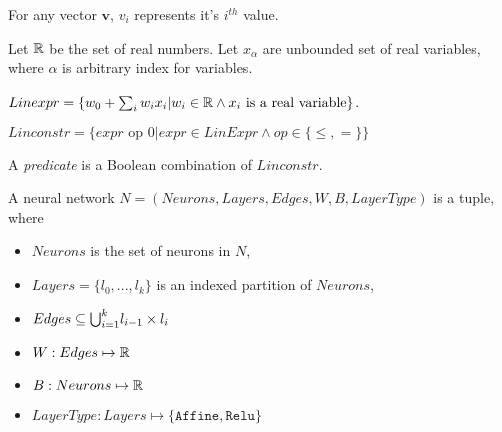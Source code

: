 For any vector $\boldsymbol{v}$, $v_i$ represents it's $i^{th}$ value.  

Let $\mathbb{R}$ be the set of real numbers.
Let $x_{\alpha}$ are unbounded set of real variables, where
$\alpha$ is arbitrary index for variables.

\begin{df}
    $Linexpr = \{ w_0 + \sum_{i} w_i x_i | w_i \in \mathbb{R} \land x_i \text{ is a real variable} \}$.
\end{df}
  
\begin{df}
    $Linconstr = \{expr \text{ op } 0 | expr \in LinExpr \land op \in \{\leq, = \}\}$
\end{df}

A {\em predicate} is a Boolean combination of $Linconstr$.

\begin{df}
    A neural network $N = (Neurons, Layers, Edges, W, B, LayerType)$ is a tuple, where
    \begin{itemize}
        \item $Neurons$ is the set of neurons in $N$,
        \item $Layers = \{l_0,...,l_k\}$ is an indexed partition of $Neurons$,
        \item $ Edges \subseteq {\bigcup}_{i=1}^{k} l_{i-1} \times l_{i}$
        \item $W : Edges \mapsto \mathbb{R}$
        \item $B : Neurons \mapsto \mathbb{R}$
        \item $LayerType : Layers \mapsto \{\mathtt{Affine}, \mathtt{Relu}\}$
    \end{itemize}
\end{df}


